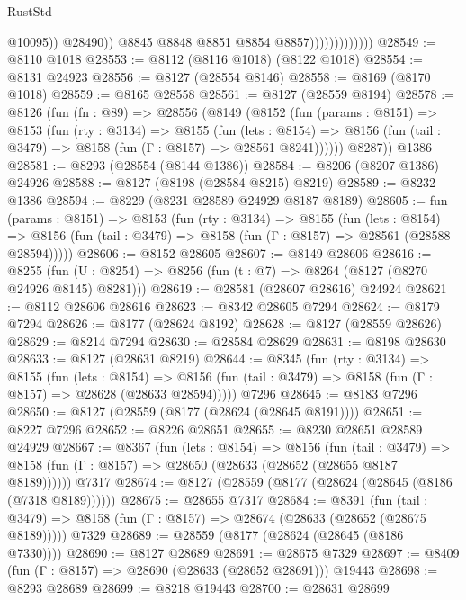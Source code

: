 \begin{lexlean}{RustStd}
\begin{coremodule}
                                      @10095))
                                  @28490))
                              @8845
                              @8848
                              @8851
                              @8854
                              @8857)))))))))))))
@28549 := @8110 @1018
@28553 := @8112 (@8116 @1018) (@8122 @1018)
@28554 := @8131 @24923
@28556 := @8127 (@28554 @8146)
@28558 := @8169 (@8170 @1018)
@28559 := @8165 @28558
@28561 := @8127 (@28559 @8194)
@28578 := @8126
    (fun (fn : @89) =>
    @28556
      (@8149
        (@8152
          (fun (params : @8151) =>
          @8153
            (fun (rty : @3134) =>
            @8155
              (fun (lets : @8154) =>
              @8156 (fun (tail : @3479) => @8158 (fun (Γ : @8157) => @28561 @8241))))))
        @8287))
    @1386
@28581 := @8293 (@28554 (@8144 @1386))
@28584 := @8206 (@8207 @1386) @24926
@28588 := @8127 (@8198 (@28584 @8215) @8219)
@28589 := @8232 @1386
@28594 := @8229 (@8231 @28589 @24929 @8187 @8189)
@28605 := fun (params : @8151) =>
  @8153
    (fun (rty : @3134) =>
    @8155
      (fun (lets : @8154) =>
      @8156 (fun (tail : @3479) => @8158 (fun (Γ : @8157) => @28561 (@28588 @28594)))))
@28606 := @8152 @28605
@28607 := @8149 @28606
@28616 := @8255
    (fun (U : @8254) => @8256 (fun (t : @7) => @8264 (@8127 (@8270 @24926 @8145) @8281)))
@28619 := @28581 (@28607 @28616) @24924
@28621 := @8112 @28606 @28616
@28623 := @8342 @28605 @7294
@28624 := @8179 @7294
@28626 := @8177 (@28624 @8192)
@28628 := @8127 (@28559 @28626)
@28629 := @8214 @7294
@28630 := @28584 @28629
@28631 := @8198 @28630
@28633 := @8127 (@28631 @8219)
@28644 := @8345
    (fun (rty : @3134) =>
    @8155
      (fun (lets : @8154) =>
      @8156 (fun (tail : @3479) => @8158 (fun (Γ : @8157) => @28628 (@28633 @28594)))))
    @7296
@28645 := @8183 @7296
@28650 := @8127 (@28559 (@8177 (@28624 (@28645 @8191))))
@28651 := @8227 @7296
@28652 := @8226 @28651
@28655 := @8230 @28651 @28589 @24929
@28667 := @8367
    (fun (lets : @8154) =>
    @8156
      (fun (tail : @3479) =>
      @8158 (fun (Γ : @8157) => @28650 (@28633 (@28652 (@28655 @8187 @8189))))))
    @7317
@28674 := @8127 (@28559 (@8177 (@28624 (@28645 (@8186 (@7318 @8189))))))
@28675 := @28655 @7317
@28684 := @8391
    (fun (tail : @3479) => @8158 (fun (Γ : @8157) => @28674 (@28633 (@28652 (@28675 @8189)))))
    @7329
@28689 := @28559 (@8177 (@28624 (@28645 (@8186 @7330))))
@28690 := @8127 @28689
@28691 := @28675 @7329
@28697 := @8409 (fun (Γ : @8157) => @28690 (@28633 (@28652 @28691))) @19443
@28698 := @8293 @28689
@28699 := @8218 @19443
@28700 := @28631 @28699

\end{coremodule}
\end{lexlean}
